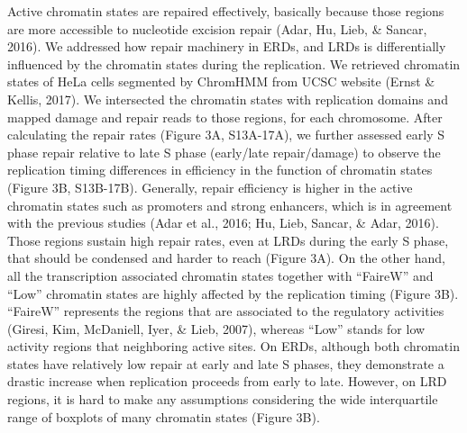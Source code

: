 Active chromatin states are repaired effectively, basically because those regions are more accessible to nucleotide excision repair (Adar, Hu, Lieb, \& Sancar, 2016). We addressed how repair machinery in ERDs, and LRDs is differentially influenced by the chromatin states during the replication. We retrieved chromatin states of HeLa cells segmented by ChromHMM from UCSC website (Ernst \& Kellis, 2017). We intersected the chromatin states with replication domains and mapped damage and repair reads to those regions, for each chromosome. After calculating the repair rates (Figure 3A, S13A-17A), we further assessed early S phase repair relative to late S phase (early/late repair/damage) to observe the replication timing differences in efficiency in the function of chromatin states (Figure 3B, S13B-17B). Generally, repair efficiency is higher in the active chromatin states such as promoters and strong enhancers, which is in agreement with the previous studies (Adar et al., 2016; Hu, Lieb, Sancar, \& Adar, 2016). Those regions sustain high repair rates, even at LRDs during the early S phase, that should be condensed and harder to reach (Figure 3A). On the other hand, all the transcription associated chromatin states together with “FaireW” and “Low” chromatin states are highly affected by the replication timing (Figure 3B). “FaireW” represents the regions that are associated to the regulatory activities (Giresi, Kim, McDaniell, Iyer, \& Lieb, 2007), whereas “Low” stands for low activity regions that neighboring active sites. On ERDs, although both chromatin states have relatively low repair at early and late S phases, they demonstrate a drastic increase when replication proceeds from early to late.  However, on LRD regions, it is hard to make any assumptions considering the wide interquartile range of boxplots of many chromatin states (Figure 3B).

